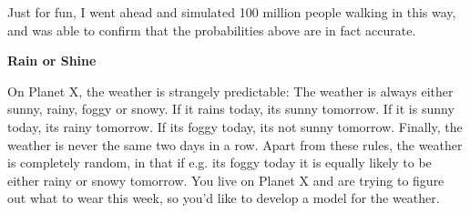 \documentclass[11pt]{article}
\begin{document}
\begin{enumerate}
            Just for fun, I went ahead and simulated 100 million people walking
            in this way, and was able to confirm that the probabilities above
            are in fact accurate.
    \end{enumerate}
    \medskip

    \textbf{Rain or Shine}
    
    On Planet X, the weather is strangely predictable: The weather is always 
    either sunny, rainy, foggy or snowy. If it rains today, its sunny tomorrow. 
    If it is sunny today, its rainy tomorrow. If its foggy today, its not sunny 
    tomorrow. Finally, the weather is never the same two days in a row. 
    Apart from these rules, the weather is completely random, in that if 
    e.g. its foggy today it is equally likely to be either rainy or snowy 
    tomorrow. You live on Planet X and are trying to figure out what to wear 
    this week, so you’d like to develop a model for the weather.
\end{document}
